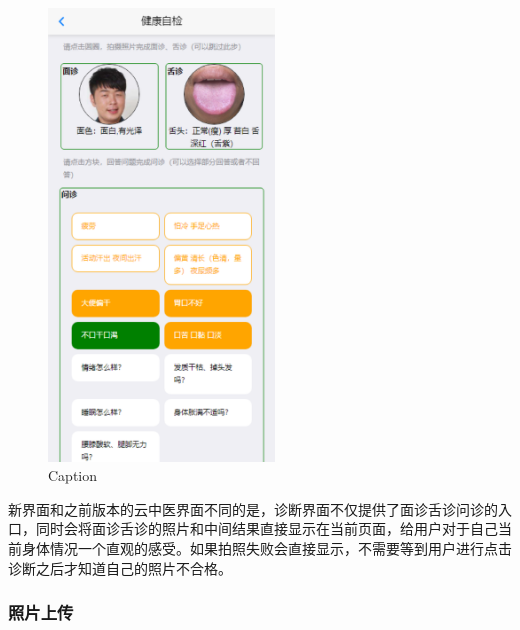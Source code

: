 \begin{figure}[ht]
    \centering
    \includegraphics[height=12cm]{images/diag.png}
    \caption{Caption}
    \label{fig:diag}
\end{figure}
新界面和之前版本的云中医界面不同的是，诊断界面不仅提供了面诊舌诊问诊的入口，同时会将面诊舌诊的照片和中间结果直接显示在当前页面，给用户对于自己当前身体情况一个直观的感受。如果拍照失败会直接显示，不需要等到用户进行点击诊断之后才知道自己的照片不合格。
	
\subsubsection{照片上传}

